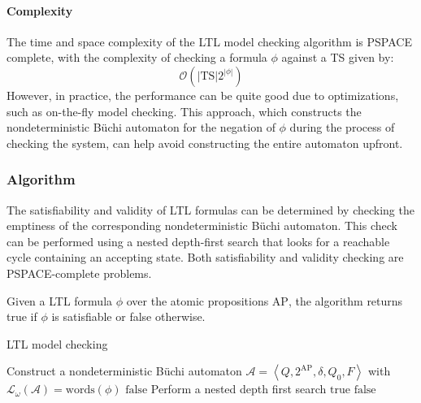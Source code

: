 \paragraph*{Complexity}
The time and space complexity of the LTL model checking algorithm is PSPACE complete, with the complexity of checking a formula $\phi$ against a TS given by:
\[\mathcal{O}(\left\lvert \text{TS}\right\rvert 2^{\left\lvert \phi\right\rvert })\]
\noindent However, in practice, the performance can be quite good due to optimizations, such as on-the-fly model checking. 
This approach, which constructs the nondeterministic Büchi automaton for the negation of $\phi$ during the process of checking the system, can help avoid constructing the entire automaton upfront.

\subsubsection{Algorithm}
The satisfiability and validity of LTL formulas can be determined by checking the emptiness of the corresponding nondeterministic Büchi automaton. 
This check can be performed using a nested depth-first search that looks for a reachable cycle containing an accepting state. 
Both satisfiability and validity checking are PSPACE-complete problems.

Given a LTL formula $\phi$ over the atomic propositions $\text{AP}$, the algorithm returns true if $\phi$ is satisfiable or false otherwise.
\begin{algorithm}[H]
    \caption{LTL model checking}
        \begin{algorithmic}[1]
            \State Construct a nondeterministic Büchi automaton $\mathcal{A}=\left\langle Q,2^{\text{AP}},\delta,Q_0,F\right\rangle$ with $\mathcal{L}_{\omega}(\mathcal{A})=\text{words}(\phi)$
                \State \Return $\text{false}$
            \EndIf
            \Repeat
                \State Perform a nested depth first search
                    \State \Return $\text{true}$
                \EndIf 
            \State \Return $\text{false}$
        \end{algorithmic}
\end{algorithm}